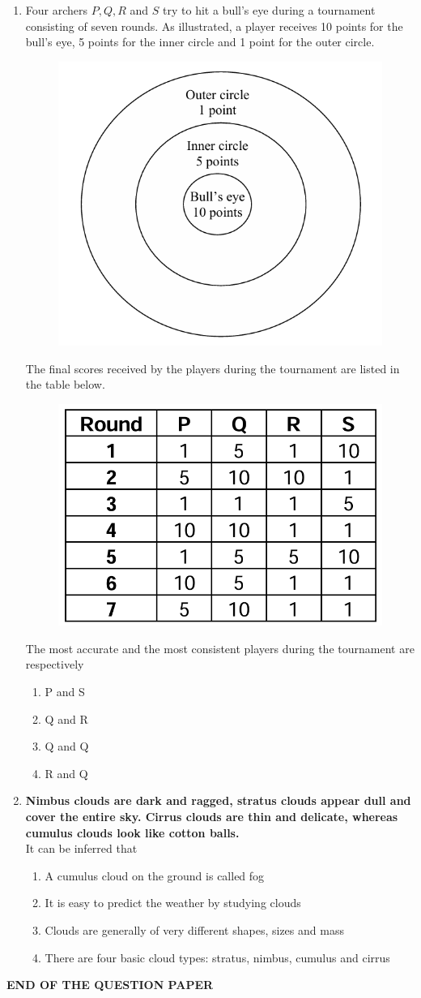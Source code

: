 \documentclass{article}
\begin{document}
\begin{enumerate}
\item Four archers $P, Q, R$ and $S$ try to hit a bull’s eye during a tournament consisting of seven rounds. As illustrated, a player receives 10 points for the bull’s eye, 5 points for the inner circle and 1 point for the outer circle.
\begin{figure}[H]
    \centering
    \includegraphics[width=0.5\linewidth]{figs/q64(1).png}
    \caption{}
    \label{fig:q64(1)}
\end{figure}
The final scores received by the players during the tournament are listed in the table below.
\begin{figure}[H]
    \centering
    \includegraphics[width=0.3\linewidth]{tables/q64(2).png}
    \caption{}
    \label{fig:q64(2)}
\end{figure}
The most accurate and the most consistent players during the tournament are respectively
\begin{multicols}{4}
\begin{enumerate}
\item P and S
\item Q and R
\item Q and Q
\item R and Q
\end{enumerate}
\end{multicols}

\item \textbf{Nimbus clouds are dark and ragged, stratus clouds appear dull and cover the entire sky. Cirrus clouds are thin and delicate, whereas cumulus clouds look like cotton balls.}\\

It can be inferred that
\begin{enumerate}
\item A cumulus cloud on the ground is called fog
\item It is easy to predict the weather by studying clouds
\item Clouds are generally of very different shapes, sizes and mass
\item There are four basic cloud types: stratus, nimbus, cumulus and cirrus
\end{enumerate}

\end{enumerate}
\vspace{1cm}
\centering
\large
\textbf{END OF THE QUESTION PAPER}
\end{document}
